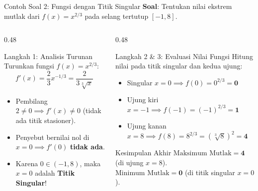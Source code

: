 \documentclass[aspectratio=169,10pt]{beamer}
\begin{document}
\begin{frame}{Contoh Soal 2: Fungsi dengan Titik Singular}
    \textbf{Soal}: Tentukan nilai ekstrem mutlak dari $f(x) = x^{2/3}$ pada selang tertutup $[-1, 8]$.

    \pause
    \begin{columns}[T]
        \begin{column}{0.48\textwidth}
            \begin{block}{Langkah 1: Analisis Turunan}
                Turunkan fungsi $f(x) = x^{2/3}$:
                \[
                    f'(x) = \frac{2}{3} x^{-1/3} = \frac{2}{3\sqrt[3]{x}}
                \]
                \begin{itemize}
                    \item Pembilang $2 \neq 0 \implies f'(x) \neq 0$ (tidak ada titik stasioner).
                    \item Penyebut bernilai nol di $x = 0 \implies f'(0)$ \textbf{tidak ada}.
                    \item Karena $0 \in (-1, 8)$, maka $x = 0$ adalah \textbf{Titik Singular}!
                \end{itemize}
            \end{block}
        \end{column}

        \begin{column}{0.48\textwidth}
            \begin{exampleblock}{Langkah 2 \& 3: Evaluasi Nilai Fungsi}
                Hitung nilai pada titik singular dan kedua ujung:
                \begin{itemize}
                    \item Singular $x = 0 \implies f(0) = 0^{2/3} = \mathbf{0}$
                    \item Ujung kiri $x = -1 \implies f(-1) = (-1)^{2/3} = \mathbf{1}$
                    \item Ujung kanan $x = 8 \implies f(8) = 8^{2/3} = (\sqrt[3]{8})^2 = \mathbf{4}$
                \end{itemize}
            \end{exampleblock}

            \begin{alertblock}{Kesimpulan Akhir}
                $\text{Maksimum Mutlak} = \mathbf{4}$ (di ujung $x = 8$).\\
                $\text{Minimum Mutlak} = \mathbf{0}$ (di titik singular $x = 0$).
            \end{alertblock}
        \end{column}
    \end{columns}
\end{frame}
\end{document}
